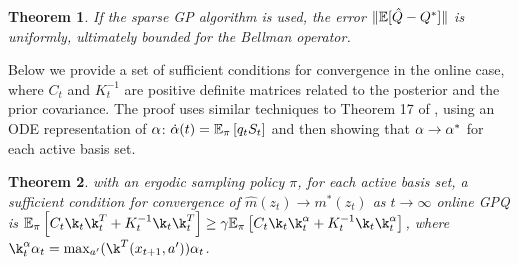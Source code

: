 \documentclass[letterpaper,12pt,peerreviewca,draftcls]{IEEEtran}
\newtheorem{theorem}{Theorem}%
\begin{document}
\begin{theorem}\label{thm:sparse}
If the sparse GP algorithm is used, the error $\|\mathbb{E} [\hat Q- Q^*]\|$ is uniformly, ultimately bounded for the Bellman operator.
\end{theorem}


Below we provide a set of sufficient conditions for convergence in the online case, where $C_t$ and $K_t^{-1}$ are positive definite matrices related to the posterior and the prior covariance.
The proof uses similar techniques to Theorem 17 of \cite{Melo08_ICML}, using an ODE representation of $\alpha$: $\dot \alpha(t)=\mathbb{E}_\pi\left[q_{t}S_{t}\right]$ and then showing that $\alpha\to\alpha^*$ for each active basis set.
\begin{theorem}
with an ergodic sampling policy $\pi$, for each active basis set, a sufficient condition for convergence of $\hat m(z_t)\to m^*(z_t)$ as $t \to \infty$  online GPQ is $\E_\pi\left[C_t\k_t\k^T_t+K_t^{-1}\k_t\k^T_t\right]\geq\gamma\E_\pi\left[C_t\k_t\k^\al_t+K_t^{-1}\k_t\k^\al_t\right]$, where $\k^\al_{t}\al_t=\max_{a'}(\k^T(x_{t+1},a'))\al_t$.
\end{theorem}


\newpage
\end{document}
